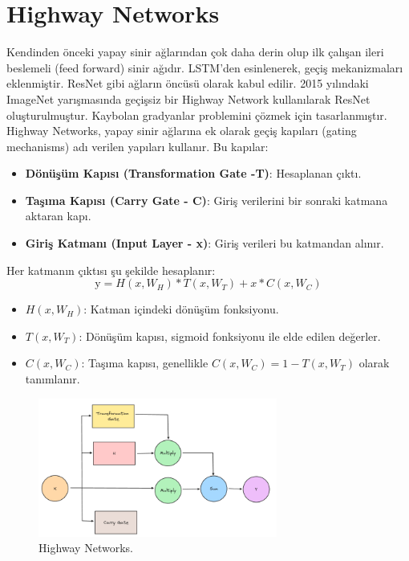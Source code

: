 \section{Highway Networks}
Kendinden önceki yapay sinir ağlarından çok daha derin olup ilk çalışan ileri beslemeli (feed forward) sinir ağıdır. LSTM'den esinlenerek, geçiş mekanizmaları eklenmiştir. ResNet gibi ağların öncüsü olarak kabul edilir. 2015 yılındaki ImageNet yarışmasında geçişsiz bir Highway Network kullanılarak ResNet oluşturulmuştur. Kaybolan gradyanlar problemini çözmek için tasarlanmıştır. Highway Networks,  yapay sinir ağlarına ek olarak geçiş kapıları (gating mechanisms) adı verilen yapıları kullanır. Bu kapılar:
\begin{itemize}
	\item \textbf{Dönüşüm Kapısı (Transformation Gate -T)}: Hesaplanan çıktı.
	\item \textbf{Taşıma Kapısı (Carry Gate - C)}: Giriş verilerini bir sonraki katmana aktaran kapı.
	\item \textbf{Giriş Katmanı (Input Layer - x)}: Giriş verileri bu katmandan alınır.
\end{itemize}

Her katmanın çıktısı şu şekilde hesaplanır:
\[ \text{y} = H(x, W_H) * T (x, W_T) + x * C(x, W_C) \]

\begin{itemize}
	\item $H(x, W_H)$: Katman içindeki dönüşüm fonksiyonu.
	\item $T(x, W_T)$: Dönüşüm kapısı, sigmoid fonksiyonu ile elde edilen değerler.
	\item $C(x, W_C)$: Taşıma kapısı, genellikle $C(x, W_C)  = 1- T(x, W_T)$ olarak tanımlanır.
\end{itemize}

\begin{figure}[h]
    \centering
    \includegraphics[width=0.7\textwidth]{images/highway_networks.png}
    \caption{Highway Networks.}
    \label{fig:enter-label}
\end{figure}

\newpage